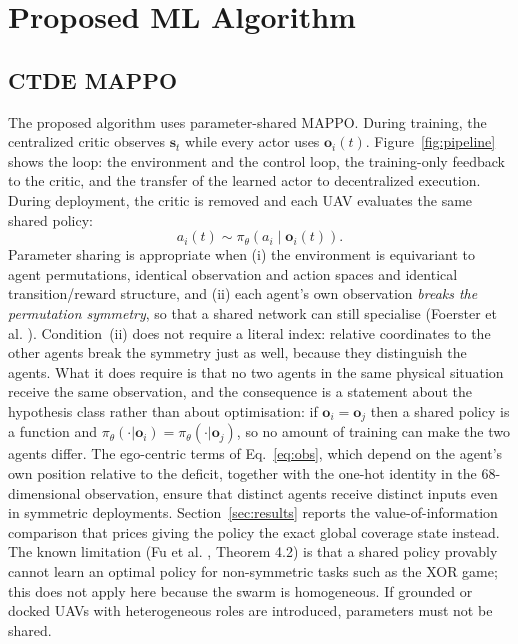 \documentclass[conference]{IEEEtran}
\begin{document}
\section{Proposed ML Algorithm}
\label{sec:algorithm}

\subsection{CTDE MAPPO}
\label{sec:mappo}
The proposed algorithm uses parameter-shared MAPPO. During training, the centralized critic observes $\mathbf s_t$ while every actor uses $\mathbf o_i(t)$. Figure~\ref{fig:pipeline} shows the loop: the environment and the control loop, the training-only feedback to the critic, and the transfer of the learned actor to decentralized execution. During deployment, the critic is removed and each UAV evaluates the same shared policy:
\begin{equation}
a_i(t)\sim\pi_{\theta}\left(a_i\mid\mathbf o_i(t)\right).
\label{eq:policy}
\end{equation}
Parameter sharing is appropriate when (i) the environment is equivariant to agent permutations, identical observation and action spaces and identical transition/reward structure, and (ii) each agent's own observation \emph{breaks the permutation symmetry}, so that a shared network can still specialise (Foerster et al. \cite{foerster2016}). Condition~(ii) does not require a literal index: relative coordinates to the other agents break the symmetry just as well, because they distinguish the agents. What it does require is that no two agents in the same physical situation receive the same observation, and the consequence is a statement about the hypothesis class rather than about optimisation: if $\mathbf o_i=\mathbf o_j$ then a shared policy is a function and $\pi_\theta(\cdot|\mathbf o_i)=\pi_\theta(\cdot|\mathbf o_j)$, so no amount of training can make the two agents differ.  The ego-centric terms of Eq.~\eqref{eq:obs}, which depend on the agent's own position relative to the deficit, together with the one-hot identity in the 68-dimensional observation, ensure that distinct agents receive distinct inputs even in symmetric deployments.  Section~\ref{sec:results} reports the value-of-information comparison that prices giving the policy the exact global coverage state instead. The known limitation (Fu et al. \cite{fu2022}, Theorem 4.2) is that a shared policy provably cannot learn an optimal policy for non-symmetric tasks such as the XOR game; this does not apply here because the swarm is homogeneous. If grounded or docked UAVs with heterogeneous roles are introduced, parameters must not be shared.
\end{document}
